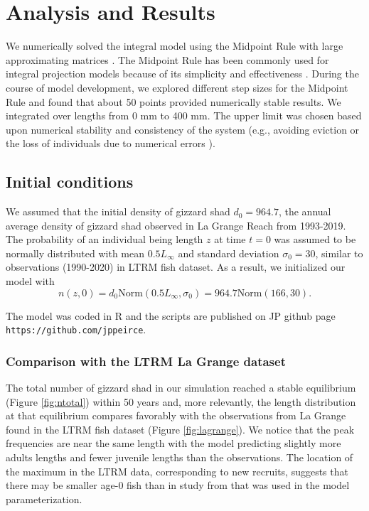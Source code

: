 \documentclass[preprint,review,12pt,authoryear]{elsarticle}
\begin{document}
\section{Analysis and Results}
We numerically solved the integral model using the Midpoint Rule with large approximating matrices \citep{burden2005numerical}. The Midpoint Rule has been commonly used for integral projection models because of its simplicity and effectiveness \citep{ellner2006integral, ramula2009integral,  merow2014advancing}. During the course of model development, we explored different step sizes for the Midpoint Rule and found that about 50 points provided numerically stable results. We integrated over lengths from 0 mm to 400 mm. The upper limit was chosen based upon numerical stability and consistency of the system (e.g., avoiding eviction or the loss of individuals due to numerical errors \citep{williams2012avoiding}). 

\subsection{Initial conditions}  We assumed that the initial density of gizzard shad $d_0 = 964.7$, the annual average density of gizzard shad observed in La Grange Reach from 1993-2019.  The probability of an individual being length $z$ at time $t=0$  was assumed to be normally distributed with mean $0.5L_\infty$ and standard deviation $\sigma_0 = 30$, similar to observations (1990-2020) in LTRM fish dataset.  As a result, we initialized our model with
\begin{equation}\label{eq:n}
 n(z,0) = d_0 \mbox{Norm} (0.5 L_\infty, \sigma_0) = 964.7 \mbox{Norm} (166, 30). 
 \end{equation}

The model was coded in R \citep{R} and the scripts are published on JP github page \verb+https://github.com/jppeirce+.

\subsubsection{Comparison with the LTRM La Grange dataset}
The total number of gizzard shad in our simulation reached a stable equilibrium (Figure \ref{fig:ntotal}) within 50 years and, more relevantly, the length distribution at that equilibrium compares favorably with the observations from La Grange found in the LTRM fish dataset (Figure \ref{fig:lagrange}). We notice that the peak frequencies are near the same length with the model predicting slightly more adults lengths and fewer juvenile lengths than the observations. The location of the maximum in the LTRM data, corresponding to new recruits, suggests that there may be smaller age-0 fish than in study from \citep{michaletz2017variation} that was used in the model parameterization.  
\end{document}
